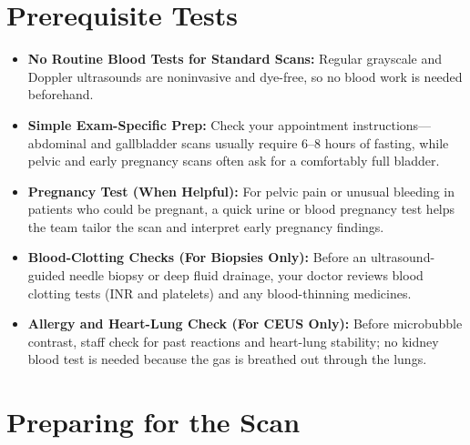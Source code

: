 \section{Prerequisite Tests}

\begin{itemize}
    \item \textbf{No Routine Blood Tests for Standard Scans:} Regular grayscale and Doppler ultrasounds are noninvasive and dye-free, so no blood work is needed beforehand.
    \item \textbf{Simple Exam-Specific Prep:} Check your appointment instructions---abdominal and gallbladder scans usually require 6--8 hours of fasting, while pelvic and early pregnancy scans often ask for a comfortably full bladder.
    \item \textbf{Pregnancy Test (When Helpful):} For pelvic pain or unusual bleeding in patients who could be pregnant, a quick urine or blood pregnancy test helps the team tailor the scan and interpret early pregnancy findings.
    \item \textbf{Blood-Clotting Checks (For Biopsies Only):} Before an ultrasound-guided needle biopsy or deep fluid drainage, your doctor reviews blood clotting tests (INR and platelets) and any blood-thinning medicines.
    \item \textbf{Allergy and Heart-Lung Check (For CEUS Only):} Before microbubble contrast, staff check for past reactions and heart-lung stability; no kidney blood test is needed because the gas is breathed out through the lungs.
\end{itemize}

\section{Preparing for the Scan}

